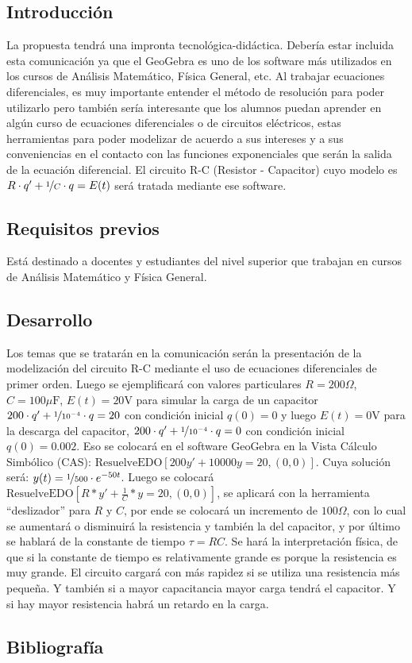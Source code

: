 \subsection{Introducción}

La propuesta tendrá una impronta tecnológica-didáctica. Debería estar incluida esta comunicación ya que el GeoGebra es uno de los software más utilizados en los cursos de Análisis Matemático, Física General, etc. Al trabajar ecuaciones diferenciales, es muy importante entender el método de resolución para poder utilizarlo pero también sería interesante que los alumnos puedan aprender en algún curso de ecuaciones diferenciales o de circuitos eléctricos, estas herramientas para poder modelizar de acuerdo a sus intereses y a sus conveniencias en el contacto con las funciones exponenciales que serán la salida de la ecuación diferencial. El circuito R-C (Resistor - Capacitor) cuyo modelo es $R \cdot q' + \nicefrac{1}{C} \cdot q = E(t)$ será tratada mediante ese software. 

\subsection{Requisitos previos}

Está destinado a docentes y estudiantes del nivel superior que trabajan en cursos de Análisis Matemático y Física General.

\subsection{Desarrollo}

Los temas que se tratarán en la comunicación serán la presentación de la modelización del circuito R-C mediante el uso de ecuaciones diferenciales de primer orden. Luego se ejemplificará con valores particulares $R = 200 \Omega$, $C = 100 \mu \text{F}$, $E(t) = 20 \text{V}$ para simular la carga de un capacitor $200 \cdot q' + \nicefrac{1}{10^{-4}} \cdot q = 20$ con condición inicial $q(0) = 0$ y luego $E(t) = 0\text{V}$ para la descarga del capacitor, $200 \cdot q' + \nicefrac{1}{10^{-4}} \cdot q = 0$ con condición inicial $q(0) = 0.002$. Eso se colocará en el software GeoGebra en la Vista Cálculo Simbólico (CAS): $\text{ResuelveEDO}[200y'+10000y=20,(0,0)]$. Cuya solución será: $y(t) = \nicefrac{1}{500} \cdot e^{-50t}$. Luego se colocará $\text{ResuelveEDO}[R*y'+\frac{1}{C}*y=20,(0,0)]$, se aplicará con la herramienta “deslizador” para $R$ y $C$, por ende se colocará un incremento de $100 \Omega$, con lo cual se aumentará o disminuirá la resistencia y también la del capacitor, y por último se hablará de la constante de tiempo $\tau = RC$. Se hará la interpretación física, de que si la constante de tiempo es relativamente grande es porque la resistencia es muy grande. El circuito cargará con más rapidez si se utiliza una resistencia más pequeña. Y también si a mayor capacitancia mayor carga tendrá el capacitor. Y si hay mayor resistencia habrá un retardo en la carga. 

\subsection{Bibliografía}

\nocite{*}
\printbibliography[keyword={06}]